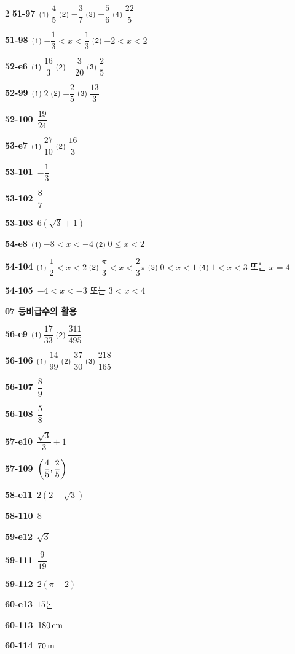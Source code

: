 \documentclass[10pt,a4paper]{article}
\begin{document}
\begin{multicols}{2}
\noindent\textbf{51-97}\ ⑴ $\dfrac{4}{5}$ ⑵ $-\dfrac{3}{7}$ ⑶ $-\dfrac{5}{6}$ ⑷ $\dfrac{22}{5}$\par
\noindent\textbf{51-98}\ ⑴ $-\dfrac{1}{3}<x<\dfrac{1}{3}$ ⑵ $-2<x<2$\par
\noindent\textbf{52-e6}\ ⑴ $\dfrac{16}{3}$ ⑵ $-\dfrac{3}{20}$ ⑶ $\dfrac{2}{5}$\par
\noindent\textbf{52-99}\ ⑴ $2$ ⑵ $-\dfrac{2}{5}$ ⑶ $\dfrac{13}{3}$\par
\noindent\textbf{52-100}\ $\dfrac{19}{24}$\par
\noindent\textbf{53-e7}\ ⑴ $\dfrac{27}{10}$ ⑵ $\dfrac{16}{3}$\par
\noindent\textbf{53-101}\ $-\dfrac{1}{3}$\par
\noindent\textbf{53-102}\ $\dfrac{8}{7}$\par
\noindent\textbf{53-103}\ $6(\sqrt{3}+1)$\par
\noindent\textbf{54-e8}\ ⑴ $-8<x<-4$ ⑵ $0\le x<2$\par
\noindent\textbf{54-104}\ ⑴ $\dfrac{1}{2}<x<2$ ⑵ $\dfrac{\pi}{3}<x<\dfrac{2}{3}\pi$ ⑶ $0<x<1$ ⑷ $1<x<3$ 또는 $x=4$\par
\noindent\textbf{54-105}\ $-4<x<-3$ 또는 $3<x<4$\par
\noindent\textbf{07 등비급수의 활용}\par\smallskip
\noindent\textbf{56-e9}\ ⑴ $\dfrac{17}{33}$ ⑵ $\dfrac{311}{495}$\par
\noindent\textbf{56-106}\ ⑴ $\dfrac{14}{99}$ ⑵ $\dfrac{37}{30}$ ⑶ $\dfrac{218}{165}$\par
\noindent\textbf{56-107}\ $\dfrac{8}{9}$\par
\noindent\textbf{56-108}\ $\dfrac{5}{8}$\par
\noindent\textbf{57-e10}\ $\dfrac{\sqrt{3}}{3}+1$\par
\noindent\textbf{57-109}\ $\left(\dfrac{4}{5}{,}\mkern3mu\mathopen{}\dfrac{2}{5}\right)$\par
\noindent\textbf{58-e11}\ $2(2+\sqrt{3})$\par
\noindent\textbf{58-110}\ $8$\par
\noindent\textbf{59-e12}\ $\sqrt{3}$\par
\noindent\textbf{59-111}\ $\dfrac{9}{19}$\par
\noindent\textbf{59-112}\ $2(\pi-2)$\par
\noindent\textbf{60-e13}\ $15$톤\par
\noindent\textbf{60-113}\ $180\mkern3mu \mathrm{cm}$\par
\noindent\textbf{60-114}\ $70\mkern3mu \mathrm{m}$\par

\end{multicols}
\end{document}
